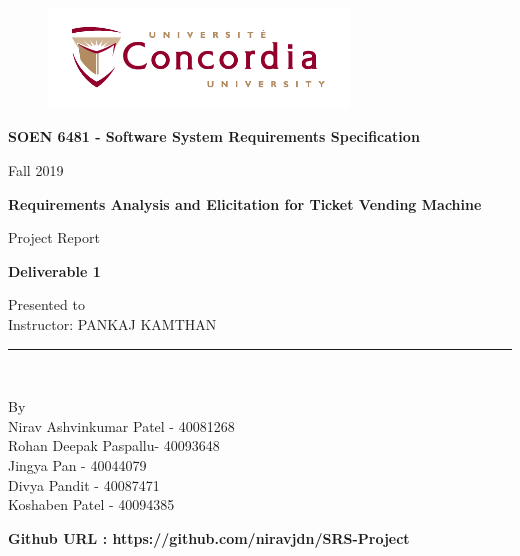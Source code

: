 \documentclass[11pt, english]{report}
\begin{document}
\begin{titlepage}

\begin{center}
\vspace*{-1in}
\begin{figure}[htb]
\begin{center}
\includegraphics[width=8cm]{images/logo.png}
\end{center}
\end{figure}
\begin{Large}
\textbf{SOEN 6481 - Software System Requirements Specification} \\
\end{Large}
\vspace*{0.1in}
Fall 2019\\
\vspace*{0.5in}
\begin{Large}
\textbf{Requirements Analysis and Elicitation for Ticket Vending Machine} \\
\end{Large}
\vspace*{0.4in}
\begin{large}
Project Report\\
\end{large}
\vspace*{0.2in}
\begin{Large}
\textbf{Deliverable 1} \\
\end{Large}
\vspace*{0.3in}
\begin{large}
Presented to \\
\vspace*{0.1in}
Instructor: PANKAJ KAMTHAN 
 \\
\end{large}
\vspace*{0.3in}
\rule{80mm}{0.1mm}\\
\vspace*{0.1in}
\begin{large}
By \\
Nirav Ashvinkumar Patel - 40081268\\
Rohan Deepak Paspallu- 40093648\\
Jingya Pan - 40044079\\
Divya Pandit - 40087471 \\
Koshaben Patel - 40094385 \\


\end{large}
\vspace*{0.3in}
\textbf{Github URL : https://github.com/niravjdn/SRS-Project}
\end{center}
\end{titlepage}
\end{document}
